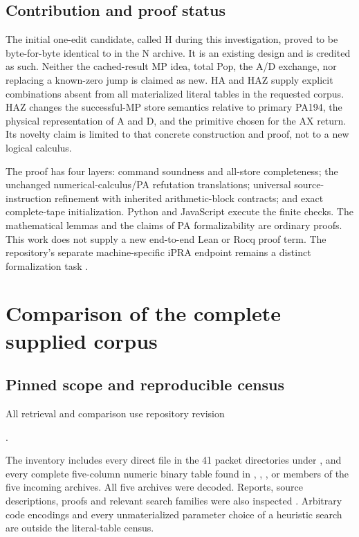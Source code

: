 \documentclass[11pt]{article}
\begin{document}
\subsection{Contribution and proof status}

The initial one-edit candidate, called H during this investigation, proved
to be byte-for-byte identical to
 in the N archive. It is an
existing design and is credited as such. Neither the cached-result MP idea,
total Pop, the A/D exchange, nor replacing a known-zero jump is claimed as
new. HA and HAZ supply explicit combinations absent from all materialized
literal tables in the requested corpus. HAZ changes the successful-MP store
semantics relative to primary PA194, the physical representation of A and D,
and the primitive chosen for the AX return. Its novelty claim is limited
to that concrete construction and proof, not to a new logical calculus.

The proof has four layers: command soundness and all-store completeness;
the unchanged numerical-calculus/PA refutation translations; universal
source-instruction refinement with inherited arithmetic-block contracts;
and exact complete-tape initialization. Python and JavaScript execute the
finite checks. The mathematical lemmas and the claims of PA formalizability
are ordinary proofs. This work does not supply a new end-to-end Lean or
Rocq proof term. The repository's separate machine-specific iPRA endpoint
remains a distinct formalization task \cite{status}.

\section{Comparison of the complete supplied corpus}

\subsection{Pinned scope and reproducible census}

All retrieval and comparison use repository revision
\begin{center}\small
{}.
\end{center}
The inventory includes every direct  file in the 41 packet
directories under , and every
complete five-column numeric binary table found in ,
, , or  members of the five incoming
archives. All five archives were decoded. Reports, source descriptions,
proofs and relevant search families were also inspected \cite{incoming}. Arbitrary code
encodings and every unmaterialized parameter choice of a heuristic search
are outside the literal-table census.
\end{document}
